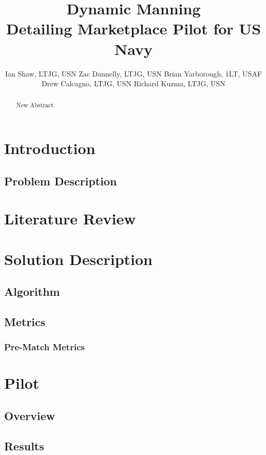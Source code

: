 \documentclass{article}
\title{Dynamic Manning \\ \large Detailing Marketplace Pilot for US Navy}
\author{Ian Shaw, LTJG, USN \quad Zac Dannelly, LTJG, USN \quad Brian Yarborough, 1LT, USAF \\
Drew Calcagno, LTJG, USN \quad Richard Kuzma, LTJG, USN}
\begin{document}
\maketitle

\begin{abstract}
New Abstract.
\end{abstract}


\newpage

\tableofcontents

\newpage

\section{Introduction}

\subsection{Problem Description}

\section{Literature Review}

\section{Solution Description}

\subsection{Algorithm}

\subsection{Metrics}

\subsubsection{Pre-Match Metrics}

\section{Pilot}

\subsection{Overview}

\subsection{Results}
\end{document}
